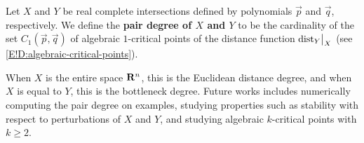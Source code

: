 \begin{definition}
  Let $X$ and $Y$ be real complete intersections defined by polynomials $\vec{p}$ and $\vec{q}$, respectively. We define the \textbf{pair degree of $X$ and $Y$} to be the cardinality of the set $C_1(\vec{p}, \vec{q})$ of algebraic $1$-critical points of the distance function $\mathord{\operatorname{dist}}_Y\big|_X$ (see \cref{E!D:algebraic-critical-points}).
\end{definition}

When $X$ is the entire space $\mathbf{R}^n$, this is the Euclidean distance degree, and when $X$ is equal to $Y$, this is the bottleneck degree. Future works includes numerically computing the pair degree on examples, studying properties such as stability with respect to perturbations of $X$ and $Y$, and studying algebraic $k$-critical points with $k \geq 2$.